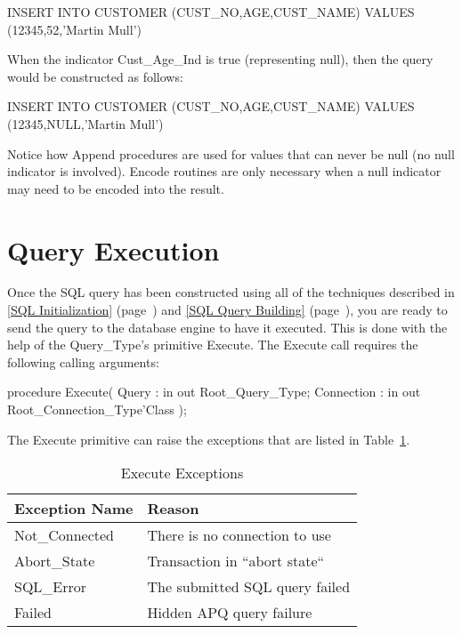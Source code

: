 \documentclass[english,letterpaper]{book}
\newcommand\Ref[1]{\textsection\ref{#1} (page~\pageref{#1})}
\begin{document}
\begin{SQL}
INSERT INTO CUSTOMER (CUST_NO,AGE,CUST_NAME)
VALUES (12345,52,'Martin Mull')
\end{SQL}

When the indicator Cust\_Age\_Ind is true (representing null), then the
query would be constructed as follows:

\begin{SQL}
INSERT INTO CUSTOMER (CUST_NO,AGE,CUST_NAME)
VALUES (12345,NULL,'Martin Mull')
\end{SQL}

Notice how Append procedures are used for values that can never be
null (no null indicator is involved). Encode routines are only necessary
when a null indicator may need to be encoded into the result.




\section{Query Execution}

Once the SQL query has been constructed using all of the techniques
described in \Ref{SQL Initialization} and \Ref{SQL Query Building},
you are ready to send the query to the database engine to have it
executed. This is done with the help of the Query\_Type's primitive
Execute. The Execute call requires the following calling arguments:

\begin{Code}
procedure Execute(
   Query :      in out Root_Query_Type;
   Connection : in out Root_Connection_Type'Class
);
\end{Code}

The Execute primitive can raise the exceptions that are listed
in Table~\ref{t:exx}.

\begin{table}
   \begin{center}
      \begin{tabular}{ll}
         Exception Name &  Reason\\
         \hline 
         Not\_Connected &  There is no connection to use\\
         Abort\_State   &  Transaction in {}``abort state{}``\\
         SQL\_Error     &  The submitted SQL query failed\\
         Failed         &  Hidden APQ query failure\\
      \end{tabular}
   \end{center}
   \caption{Execute Exceptions}\label{t:exx}
\end{table}
\end{document}
